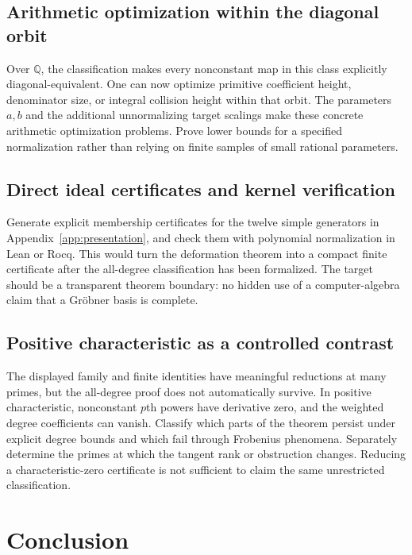 \documentclass[11pt,a4paper]{article}
\numberwithin{equation}{section}
\theoremstyle{definition}
\theoremstyle{remark}
\newcommand{\Q}{\mathbb{Q}}
\begin{document}
\subsection{Arithmetic optimization within the diagonal orbit}

Over $\Q$, the classification makes every nonconstant map in this class
explicitly diagonal-equivalent. One can now optimize primitive coefficient
height, denominator size, or integral collision height within that orbit.
The parameters $a,b$ and the additional unnormalizing target scalings make
these concrete arithmetic optimization problems. Prove lower bounds for a
specified normalization rather than relying on finite samples of small
rational parameters.

\subsection{Direct ideal certificates and kernel verification}

Generate explicit membership certificates for the twelve simple generators
in Appendix~\ref{app:presentation}, and check them with polynomial
normalization in Lean or Rocq. This would turn the deformation theorem into
a compact finite certificate after the all-degree classification has been
formalized. The target should be a transparent theorem boundary: no hidden
use of a computer-algebra claim that a Gr\"obner basis is complete.

\subsection{Positive characteristic as a controlled contrast}

The displayed family and finite identities have meaningful reductions at
many primes, but the all-degree proof does not automatically survive.
In positive characteristic, nonconstant $p$th powers have derivative zero,
and the weighted degree coefficients can vanish. Classify which parts of
the theorem persist under explicit degree bounds and which fail through
Frobenius phenomena. Separately determine the primes at which the tangent
rank or obstruction changes. Reducing a characteristic-zero certificate
is not sufficient to claim the same unrestricted classification.

\section{Conclusion}
\end{document}
